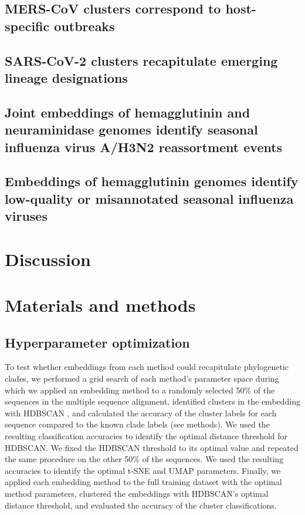 \documentclass[9pt,lineno]{elife}
\begin{document}
\subsection*{MERS-CoV clusters correspond to host-specific outbreaks}

\subsection*{SARS-CoV-2 clusters recapitulate emerging lineage designations}

\subsection*{Joint embeddings of hemagglutinin and neuraminidase genomes identify seasonal influenza virus A/H3N2 reassortment events}

\subsection*{Embeddings of hemagglutinin genomes identify low-quality or misannotated seasonal influenza viruses}

\section*{Discussion}

\section*{Materials and methods}

\subsection*{Hyperparameter optimization}

To test whether embeddings from each method could recapitulate phylogenetic clades, we performed a grid search of each method's parameter space during which we applied an embedding method to a randomly selected 50\% of the sequences in the multiple sequence alignment, identified clusters in the embedding with HDBSCAN \citep{hdbscan}, and calculated the accuracy of the cluster labels for each sequence compared to the known clade labels (see methods).
We used the resulting classification accuracies to identify the optimal distance threshold for HDBSCAN.
We fixed the HDBSCAN threshold to its optimal value and repeated the same procedure on the other 50\% of the sequences.
We used the resulting accuracies to identify the optimal t-SNE and UMAP parameters.
Finally, we applied each embedding method to the full training dataset with the optimal method parameters, clustered the embeddings with HDBSCAN's optimal distance threshold, and evaluated the accuracy of the cluster classifications.
\end{document}
